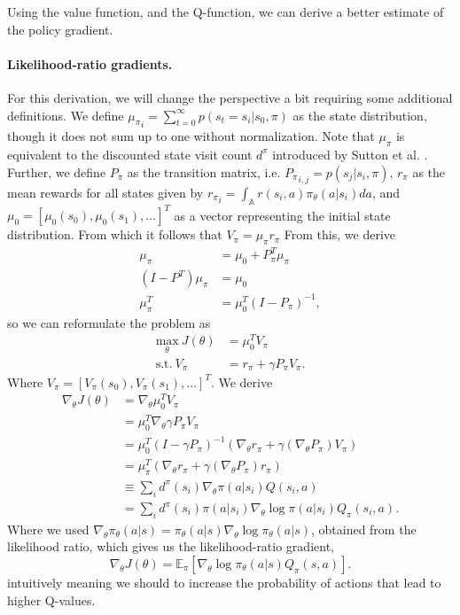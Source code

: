 Using the value function, and the Q-function, we can derive a better estimate of the policy gradient.

\paragraph{Likelihood-ratio gradients.} 
For this derivation, we will change the perspective a bit requiring some additional definitions. 
We define ${\mu_\pi}_i = \sum_{t=0}^{\infty} p(s_t=s_i | s_0, \pi)$ \cite{puterman2014markov} as the state distribution, though it does not sum up to one without normalization. Note that $\mu_\pi$ is equivalent to the discounted state visit count $d^\pi$ introduced by Sutton et al. \cite{Sutton:1999:PGM:3009657.3009806}.
Further, we define $P_\pi$ as the transition matrix, i.e. ${P_\pi}_{i,j}=p(s_j|s_i,\pi)$, $r_\pi$ as the mean rewards for all states given by ${r_\pi}_i = \int_\mathbb{A} r(s_i,a)\pi_\theta(a|s_i) da$, and $\mu_0 = \left[\mu_0(s_0),\mu_0(s_1),\ldots\right]^T$ as a vector representing the initial state distribution.
From which it follows that $V_\pi = \mu_\pi r_\pi$
From this, we derive
\begin{align}
	\mu_\pi &= \mu_0 + P_\pi^T \mu_\pi \nonumber \\
	(I-P^T)\mu_\pi &= \mu_0 \nonumber \\
	\mu_\pi^T &= \mu_0^T (I-P_\pi)^{-1} ,
\end{align}
so we can reformulate the problem as 
\begin{align}
	\underset{\theta}{\text{max}}\ J(\theta) &= \mu_0^T V_\pi \\
	\text{s.t.}\ V_\pi &= r_\pi + \gamma P_\pi V_\pi . \nonumber
\end{align}
Where $V_\pi = \left[ V_\pi(s_0), V_\pi(s_1), \ldots \right]^T$. We derive 
\begin{align*}
	\nabla_\theta J(\theta) &= \nabla_\theta \mu_0^T V_\pi
	\\ &= \mu_0^T \nabla_\theta \gamma P_\pi V_\pi
	\\ &= \mu_0^T (I - \gamma P_\pi)^{-1} (\nabla_\theta r_\pi + \gamma (\nabla_\theta P_\pi) V_\pi)
	\\ &= \mu_\pi^T (\nabla_\theta r_\pi + \gamma (\nabla_\theta P_\pi) r_\pi)
	\\ &\equiv \sum\nolimits_i d^\pi(s_i) \nabla_\theta\pi(a|s_i) Q(s_i,a)
	\\ &= \sum\nolimits_i d^\pi(s_i) \pi(a|s_i) \nabla_\theta\log\pi(a|s_i) Q_\pi(s_i,a).
\end{align*}
Where we used $\nabla_\theta \pi_\theta(a|s) = \pi_\theta(a|s)\nabla_\theta\log\pi_\theta(a|s)$, obtained from the likelihood ratio, which gives us the likelihood-ratio gradient,
\begin{equation}
	\nabla_\theta J(\theta) = \mathbb{E}_{\pi}\left[\nabla_\theta{\log\pi_\theta(a|s)}Q_\pi(s,a)\right].
	\label{eqn:like-grad}
\end{equation}
intuitively meaning we should to increase the probability of actions that lead to higher Q-values.

